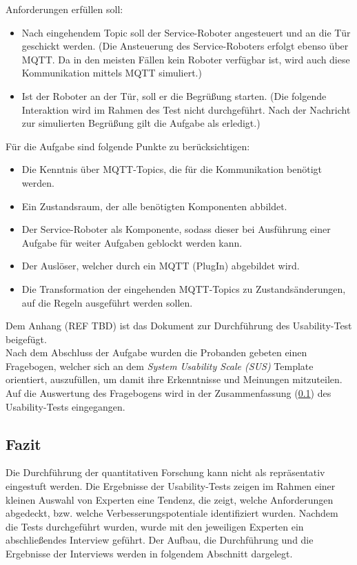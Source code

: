         Anforderungen erfüllen soll: 
        \begin{itemize}
            \item Nach eingehendem Topic soll der Service-Roboter angesteuert und an die Tür geschickt werden. 
            (Die Ansteuerung des Service-Roboters erfolgt ebenso über \acs{MQTT}. Da in den meisten Fällen kein Roboter verfügbar ist, wird auch 
            diese Kommunikation mittels \acs{MQTT} simuliert.)
            \item Ist der Roboter an der Tür, soll er die Begrüßung starten. (Die folgende Interaktion wird im Rahmen des Test nicht durchgeführt. 
            Nach der Nachricht zur simulierten Begrüßung gilt die Aufgabe als erledigt.)
        \end{itemize}
        Für die Aufgabe sind folgende Punkte zu berücksichtigen:
        \begin{itemize}
            \item Die Kenntnis über \acs{MQTT}-Topics, die für die Kommunikation benötigt werden.
            \item Ein Zustandsraum, der alle benötigten Komponenten abbildet.
            \item Der Service-Roboter als Komponente, sodass dieser bei Ausführung einer Aufgabe für weiter Aufgaben geblockt werden kann. 
            \item Der Auslöser, welcher durch ein \acs{MQTT} (PlugIn) abgebildet wird.
            \item Die Transformation der eingehenden \acs{MQTT}-Topics zu Zustandsänderungen, auf die Regeln ausgeführt werden sollen.
        \end{itemize}
        Dem Anhang (REF TBD) ist das Dokument zur Durchführung des Usability-Test beigefügt. %
        \\
        \linebreak
        Nach dem Abschluss der Aufgabe wurden die Probanden gebeten einen Fragebogen, welcher sich an dem \textit{System Usability Scale (SUS)} 
        Template orientiert, auszufüllen, um damit ihre Erkenntnisse und Meinungen mitzuteilen. Auf die Auswertung des Fragebogens wird in der 
        Zusammenfassung (\ref{subsec:usabilityFazit}) des Usability-Tests eingegangen. 

    \subsection{Fazit}
    \label{subsec:usabilityFazit}
        Die Durchführung der quantitativen Forschung kann nicht als repräsentativ eingestuft werden. Die Ergebnisse der 
        Usability-Tests zeigen im Rahmen einer kleinen Auswahl von Experten eine Tendenz, die zeigt, welche Anforderungen abgedeckt, bzw. 
        welche Verbesserungspotentiale identifiziert wurden. 
        Nachdem die Tests durchgeführt wurden, wurde 
        mit den jeweiligen Experten ein abschließendes Interview geführt. Der Aufbau, die Durchführung und die Ergebnisse der Interviews 
        werden in folgendem Abschnitt dargelegt.

